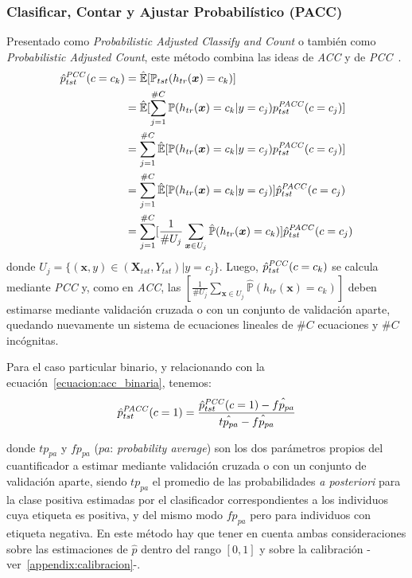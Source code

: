 \subsubsection{Clasificar, Contar y Ajustar Probabilístico
(PACC)}\label{estimacion:pacc}

Presentado como {\it Probabilistic Adjusted Classify and Count\/} o también como
{\it Probabilistic Adjusted Count}, este método combina las ideas de {\it ACC\/}
y de {\it PCC\/}~\cite{bella2010quantification, tang2010network}.
\begin{align}
\begin{split}
    \hat p^{\it PCC\/}_{tst}(c=c_k) &= \mathbb{\hat E}[\mathbb{P}_{tst}(h_{tr}(\boldsymbol{x})=c_k)] \\
    &= \mathbb{\hat E}[\sum \limits_{j=1}^{\#C}{\mathbb{P}(h_{tr}(\boldsymbol{x})=c_k|y=c_j) p^{\it PACC\/}_{tst}(c=c_j)}] \\
    &= \sum \limits_{j=1}^{\#C}\mathbb{\hat E}[{\mathbb{P}(h_{tr}(\boldsymbol{x})=c_k|y=c_j) p^{\it PACC\/}_{tst}(c=c_j)}] \\
    &= \sum \limits_{j=1}^{\#C}\mathbb{\hat E}[{\mathbb{P}(h_{tr}(\boldsymbol{x})=c_k|y=c_j)}] \hat p^{\it PACC\/}_{tst}(c=c_j) \\
    &= \sum \limits_{j=1}^{\#C} [\frac {1}{\#U_j} \sum_{\boldsymbol{x} \in U_j} \mathbb{\hat P}(h_{tr}(\boldsymbol{x})=c_k)] \hat p^{\it PACC\/}_{tst}(c=c_j)
\end{split}
\end{align}
donde \(U_j=\{(\boldsymbol{x}, y) \in (\boldsymbol{X}_{tst}, Y_{tst}) |
y=c_j\}\). Luego, \(\hat p^{\it PCC\/}_{tst}(c=c_k)\) se calcula mediante {\it
PCC\/} y, como en {\it ACC}, las \([\frac {1}{\#U_j} \sum_{\boldsymbol{x} \in
U_j} \mathbb{\hat{P}}(h_{tr}(\boldsymbol{x})=c_k)]\) deben estimarse mediante
validación cruzada o con un conjunto de validación aparte, quedando nuevamente
un sistema de ecuaciones lineales de \(\#C\) ecuaciones y \(\#C\) incógnitas.

Para el caso particular binario, y relacionando con la
ecuación~\ref{ecuacion:acc_binaria}, tenemos:
\begin{equation}
    \hat p^{\it PACC\/}_{tst}(c=1) = \frac{\hat p^{\it PCC\/}_{tst}(c=1)-\hat{fp_{pa}}}{\hat{tp_{pa}}-\hat{fp_{pa}}}
\end{equation}

donde \(tp_{pa}\) y \(fp_{pa}\) ($pa$: {\it probability average\/}) son los dos
parámetros propios del cuantificador a estimar mediante validación cruzada o con
un conjunto de validación aparte, siendo \(tp_{pa}\) el promedio de las
probabilidades {\it a posteriori\/} para la clase positiva estimadas por el
clasificador correspondientes a los individuos cuya etiqueta es positiva, y del
mismo modo \(fp_{pa}\) pero para individuos con etiqueta negativa. En este
método hay que tener en cuenta ambas consideraciones sobre las estimaciones de
\(\hat p\) dentro del rango \([0, 1]\) y sobre la calibración
-ver~\ref{appendix:calibracion}-.

